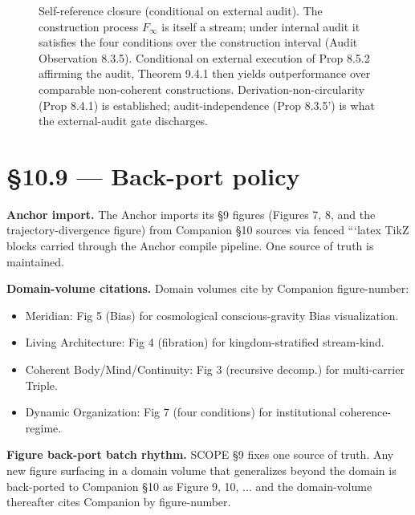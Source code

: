 \documentclass[11pt, openany]{book}
\newcommand{\sectionbreak}{\clearpage}
\begin{document}
\begin{figure}[htbp]
\caption{Self-reference closure (conditional on external audit). The construction process $F_\infty$ is itself a stream; under internal audit it satisfies the four conditions over the construction interval (Audit Observation 8.3.5). Conditional on external execution of Prop 8.5.2 affirming the audit, Theorem 9.4.1 then yields outperformance over comparable non-coherent constructions. Derivation-non-circularity (Prop 8.4.1) is established; audit-independence (Prop 8.3.5') is what the external-audit gate discharges.}
\label{fig:self-reference-closure}
\end{figure}

\sectionbreak

\section{§10.9 --- Back-port policy}

\textbf{Anchor import.} The Anchor imports its §9 figures (Figures 7, 8, and the trajectory-divergence figure) from Companion §10 sources via fenced ```latex TikZ blocks carried through the Anchor compile pipeline. One source of truth is maintained.

\textbf{Domain-volume citations.} Domain volumes cite by Companion figure-number:

\begin{itemize}
\item Meridian: Fig 5 (Bias) for cosmological conscious-gravity Bias visualization.
\item Living Architecture: Fig 4 (fibration) for kingdom-stratified stream-kind.
\item Coherent Body/Mind/Continuity: Fig 3 (recursive decomp.) for multi-carrier Triple.
\item Dynamic Organization: Fig 7 (four conditions) for institutional coherence-regime.
\end{itemize}

\textbf{Figure back-port batch rhythm.} SCOPE §9 fixes one source of truth. Any new figure surfacing in a domain volume that generalizes beyond the domain is back-ported to Companion §10 as Figure 9, 10, ... and the domain-volume thereafter cites Companion by figure-number.
\end{document}
